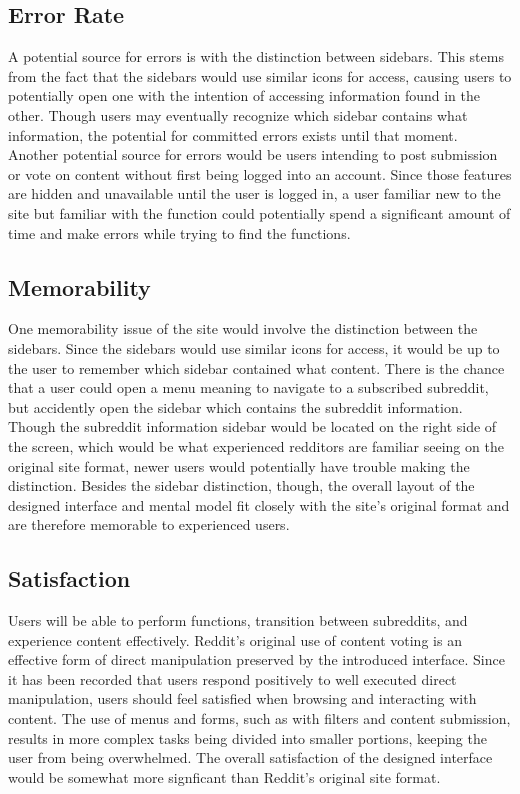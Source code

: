 \documentclass{article}
\begin{document}
\subsection{Error Rate} A potential source for errors is with the distinction between sidebars. This stems from the fact that the sidebars would use similar icons for access, causing users to potentially open one with the intention of accessing information found in the other. Though users may eventually recognize which sidebar contains what information, the potential for committed errors exists until that moment. Another potential source for errors would be users intending to post submission or vote on content without first being logged into an account. Since those features are hidden and unavailable until the user is logged in, a user familiar new to the site but familiar with the function could potentially spend a significant amount of time and make errors while trying to find the functions.

\subsection{Memorability} One memorability issue of the site would involve the distinction between the sidebars. Since the sidebars would use similar icons for access, it would be up to the user to remember which sidebar contained what content. There is the chance that a user could open a menu meaning to navigate to a subscribed subreddit, but accidently open the sidebar which contains the subreddit information. Though the subreddit information sidebar would be located on the right side of the screen, which would be what experienced redditors are familiar seeing on the original site format, newer users would potentially have trouble making the distinction. Besides the sidebar distinction, though, the overall layout of the designed interface and mental model fit closely with the site's original format and are therefore memorable to experienced users.

\subsection{Satisfaction} Users will be able to perform functions, transition between subreddits, and experience content effectively. Reddit's original use of content voting is an effective form of direct manipulation preserved by the introduced interface. Since it has been recorded that users respond positively to well executed direct manipulation, users should feel satisfied when browsing and interacting with content. The use of menus and forms, such as with filters and content submission, results in more complex tasks being divided into smaller portions, keeping the user from being overwhelmed. The overall satisfaction of the designed interface would be somewhat more signficant than Reddit's original site format.
\end{document}
